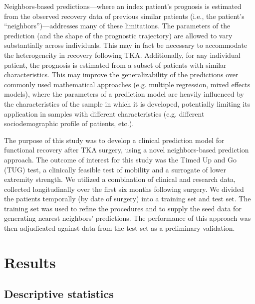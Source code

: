 \documentclass[fleqn,10pt]{wlscirep}\usepackage{knitr}
\begin{document}
Neighbors-based predictions—where an index patient’s prognosis is estimated from the observed recovery data of previous similar patients (i.e., the patient’s ``neighbors”)—addresses many of these limitations.  The parameters of the prediction (and the shape of the prognostic trajectory) are allowed to vary substantially across individuals. This may in fact be necessary to accommodate the heterogeneity in recovery following TKA\cite{page2015distinguishing}. Additionally, for any individual patient, the prognosis is estimated from a subset of patients with similar characteristics. This may improve the generalizability of the predictions over commonly used mathematical approaches (e.g. multiple regression, mixed effects models), where the parameters of a prediction model are heavily influenced by the characteristics of the sample in which it is developed, potentially limiting its application in samples with different characteristics (e.g. different sociodemographic profile of patients, etc.). 

The purpose of this study was to develop a clinical prediction model for functional recovery after TKA surgery, using a novel neighbors-based prediction approach\cite{van2014curve}. The outcome of interest for this study was the Timed Up and Go (TUG) test, a clinically feasible test of mobility and a surrogate of lower extremity strength. We utilized a combination of clinical and research data, collected longitudinally over the first six months following surgery. We divided the patients temporally (by date of surgery) into a training set and test set. The training set was used to refine the procedures and to supply the seed data for generating nearest neighbors' predictions. The performance of this approach was then adjudicated against data from the test set as a preliminary validation. 


\section*{Results}
\subsection*{Descriptive statistics}
\end{document}
